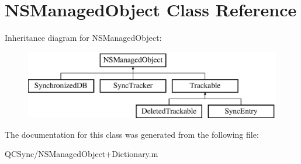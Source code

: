 \hypertarget{class_n_s_managed_object}{
\section{NSManagedObject Class Reference}
\label{class_n_s_managed_object}
}
Inheritance diagram for NSManagedObject:\begin{figure}[H]
\begin{center}
\leavevmode
\includegraphics[height=3.000000cm]{class_n_s_managed_object}
\end{center}
\end{figure}


The documentation for this class was generated from the following file:\begin{DoxyCompactItemize}
\item 
QCSync/NSManagedObject+Dictionary.m\end{DoxyCompactItemize}
